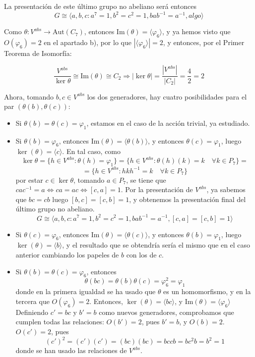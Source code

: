\documentclass[12pt]{article}
\newcommand{\Aut}{\text{Aut}}
\begin{document}
\begin{ejercicio}[2 puntos]
\begin{enumerate}[label=(\alph*)]
\begin{itemize}
\begin{itemize}
                    La presentación de este último grupo no abeliano será entonces $$G \cong \langle a,b,c : a^7 = 1, b^2 = c^2 = 1, bab^{-1} = a^{-1}, algo \rangle$$

                    Como $\theta : V^{abs} \to \Aut(C_7)$, entonces $\text{Im}(\theta) = \langle \varphi_6 \rangle$, y ya hemos visto que $O(\varphi_6) = 2$ en el apartado b), por lo que $|\langle \varphi_6 \rangle| = 2$, y entonces, por el Primer Teorema de Isomorfía:
                    
                    $$\dfrac{V^{abs}}{\ker \theta} \cong \text{Im}(\theta) \cong C_2 \Longrightarrow |\ker \theta| = \dfrac{|V^{abs}|}{|C_2|} = \dfrac{4}{2} = 2$$

                    Ahora, tomando $b,c \in V^{abs}$ los dos generadores, hay cuatro posibilidades para el par $(\theta(b), \theta(c))$:

                    \begin{itemize}
                        \item Si $\theta(b) = \theta(c) = \varphi_1$, estamos en el caso de la acción trivial, ya estudiado.
                        \item Si $\theta(b) = \varphi_6$, entonces $\text{Im}(\theta) = \langle \theta(b) \rangle$, y entonces $\theta(c) = \varphi_1$, luego $\ker(\theta) = \langle c \rangle$. En tal caso,
                        como $$\ker \theta = \{h \in V^{abs} : \theta(h) = \varphi_1\} = \{h \in V^{abs} : \theta(h)(k) = k \quad \forall k \in P_7\} = $$$$ = \{h \in V^{abs} : hkh^{-1} = k \quad \forall k \in P_7\}$$
                        por estar $c \in \ker \theta$, tomando $a \in P_7$, se tiene que $cac^{-1} = a \iff ca = ac \iff [c,a] = 1$. Por la presentación de $V^{abs}$, ya sabemos que $bc = cb$ luego $[b,c] = [c,b] = 1$, y obtenemos la presentación final del último grupo no abeliano.
                        $$G \cong \langle a,b,c : a^7=1,b^2 = c^2=1, bab^{-1} = a^{-1}, [c,a] = [c,b] = 1 \rangle$$
                        \item Si $\theta(c) = \varphi_6$, entonces $\text{Im}(\theta) = \langle \theta(c) \rangle$, y entonces $\theta(b) = \varphi_1$, luego $\ker(\theta) = \langle b \rangle$, y el resultado que se obtendría sería el mismo que en el caso anterior cambiando los papeles de $b$ con los de $c$.
                        \item Si $\theta(b) = \theta(c) = \varphi_6$, entonces 
                        $$\theta(bc) = \theta(b)\theta(c) = \varphi_6^2 = \varphi_1$$
                        donde en la primera igualdad se ha usado que $\theta$ es un homomorfismo, y en la tercera que $O(\varphi_6) = 2$. Entonces, $\ker(\theta) = \langle bc \rangle$, y $\text{Im}(\theta) = \langle \varphi_6 \rangle$ Definiendo $c' = bc$ y $b' = b$ como nuevos generadores,
                        comprobamos que cumplen todas las relaciones: $O(b') = 2$, pues $b' = b$, y $O(b) = 2$. $O(c') = 2$, pues $$(c') ^ 2 = (c')(c') = (bc)(bc) = bccb = bc^2b = b^2 = 1$$ donde se han usado las relaciones de $V^{abs}$. \\


\end{itemize}
\end{itemize}
\end{itemize}
\end{enumerate}
\end{ejercicio}
\end{document}
